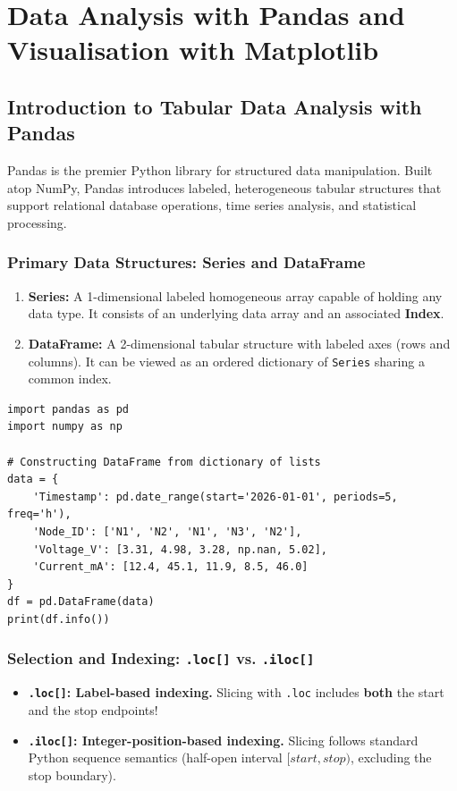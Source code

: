 \chapter{Data Analysis with Pandas and Visualisation with Matplotlib}
\label{ch:pandas_matplotlib}

\section{Introduction to Tabular Data Analysis with Pandas}

Pandas is the premier Python library for structured data manipulation. Built atop NumPy, Pandas introduces labeled, heterogeneous tabular structures that support relational database operations, time series analysis, and statistical processing.

\subsection{Primary Data Structures: Series and DataFrame}
\begin{enumerate}[leftmargin=1.8em, itemsep=3pt]
    \item \textbf{Series:} A 1-dimensional labeled homogeneous array capable of holding any data type. It consists of an underlying data array and an associated \textbf{Index}.
    \item \textbf{DataFrame:} A 2-dimensional tabular structure with labeled axes (rows and columns). It can be viewed as an ordered dictionary of \texttt{Series} sharing a common index.
\end{enumerate}

\begin{lstlisting}[caption={Creating and Manipulating DataFrames}]
import pandas as pd
import numpy as np

# Constructing DataFrame from dictionary of lists
data = {
    'Timestamp': pd.date_range(start='2026-01-01', periods=5, freq='h'),
    'Node_ID': ['N1', 'N2', 'N1', 'N3', 'N2'],
    'Voltage_V': [3.31, 4.98, 3.28, np.nan, 5.02],
    'Current_mA': [12.4, 45.1, 11.9, 8.5, 46.0]
}
df = pd.DataFrame(data)
print(df.info())
\end{lstlisting}

\subsection{Selection and Indexing: \texttt{.loc[]} vs. \texttt{.iloc[]}}
\begin{itemize}[leftmargin=1.8em, itemsep=3pt]
    \item \textbf{\texttt{.loc[]}: Label-based indexing.} Slicing with \texttt{.loc} includes \textbf{both} the start and the stop endpoints!
    \item \textbf{\texttt{.iloc[]}: Integer-position-based indexing.} Slicing follows standard Python sequence semantics (half-open interval $[start, stop)$, excluding the stop boundary).
\end{itemize}

